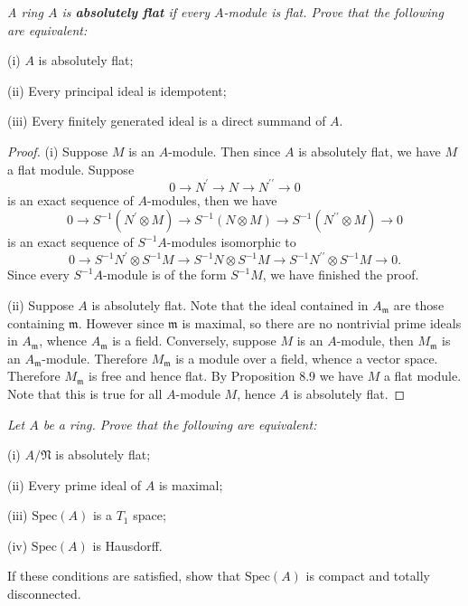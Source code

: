 \begin{problem}\em
A ring $A$ is \textbf{absolutely flat} if every $A$-module is flat. Prove that the following are equivalent: \par
(i) $A$ is absolutely flat;\par
(ii) Every principal ideal is idempotent;\par
(iii) Every finitely generated ideal is a direct summand of $A$.
\end{problem}
\begin{proof}
(i) Suppose $M$ is an $A$-module. Then since $A$ is absolutely flat, we have $M$ a flat module. Suppose 
$$
0\longrightarrow N^{\prime}\longrightarrow N\longrightarrow N^{\prime\prime}\longrightarrow 0
$$
is an exact sequence of $A$-modules, then we have 
$$
0\longrightarrow S^{-1}\left( N^{\prime}\otimes M \right) \longrightarrow S^{-1}\left( N\otimes M \right) \longrightarrow S^{-1}\left( N^{\prime\prime}\otimes M \right) \longrightarrow 0
$$
is an exact sequence of $S^{-1}A$-modules isomorphic to 
$$
0\longrightarrow S^{-1}N^{\prime}\otimes S^{-1}M\longrightarrow S^{-1}N\otimes S^{-1}M\longrightarrow S^{-1}N^{\prime\prime}\otimes S^{-1}M\longrightarrow 0.
$$
Since every $S^{-1}A$-module is of the form $S^{-1}M$, we have finished the proof.\par
(ii) Suppose $A$ is absolutely flat. Note that the ideal contained in $A_\mathfrak{m}$ are those containing $\mathfrak{m}$. However since $\mathfrak{m}$ is maximal, so there are no nontrivial prime ideals in $A_\mathfrak{m}$, whence $A_\mathfrak{m}$ is a field. Conversely, suppose $M$ is an $A$-module, then $M_\mathfrak{m}$ is an $A_\mathfrak{m}$-module. Therefore $M_\mathfrak{m}$ is a module over a field, whence a vector space. Therefore $M_\mathfrak{m}$ is free and hence flat. By Proposition 8.9 we have $M$ a flat module. Note that this is true for all $A$-module $M$, hence $A$ is absolutely flat.
\end{proof}
\begin{problem}\em
Let $A$ be a ring. Prove that the following are equivalent:\par
(i) $A/\mathfrak{N}$ is absolutely flat;\par
(ii) Every prime ideal of $A$ is maximal;\par
(iii) $\mathrm{Spec}(A)$ is a $T_1$ space;\par
(iv) $\mathrm{Spec}(A)$ is Hausdorff.\par
If these conditions are satisfied, show that $\mathrm{Spec}(A)$ is compact and totally disconnected.
\end{problem}
